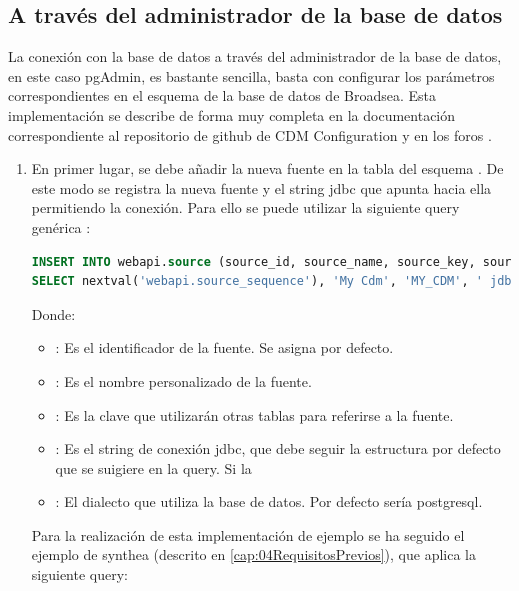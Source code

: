 \subsection{A través del administrador de la base de datos}

La conexión con la base de datos a través del administrador de la base de datos, en este caso pgAdmin, es bastante sencilla, basta con configurar los parámetros correspondientes en el esquema  de la base de datos de Broadsea. Esta implementación se describe de forma muy completa en la documentación correspondiente al repositorio de github de CDM Configuration \cite{githubCDMConfiguration} y en los foros \cite{forumAddMSDB}\cite{forumBroadQuickStart}.

\begin{enumerate}
    \item En primer lugar, se debe añadir la nueva fuente en la tabla  del esquema . De este modo se registra la nueva fuente y el string jdbc que apunta hacia ella permitiendo la conexión. Para ello se puede utilizar la siguiente query genérica \cite{githubCDMConfiguration}:

\begin{lstlisting}[language=sql]
INSERT INTO webapi.source (source_id, source_name, source_key, source_connection, source_dialect) 
SELECT nextval('webapi.source_sequence'), 'My Cdm', 'MY_CDM', ' jdbc:postgresql://server:5432/cdm?user={user}&password={password}', 'postgresql';
\end{lstlisting}

    Donde:
    \begin{itemize}
        \item {}: Es el identificador de la fuente. Se asigna por defecto.
        \item {}: Es el nombre personalizado de la fuente.
        \item {}: Es la clave que utilizarán otras tablas para referirse a la fuente.
        \item {}: Es el string de conexión jdbc, que debe seguir la estructura por defecto que se suigiere en la query. Si la
        \item {}: El dialecto que utiliza la base de datos. Por defecto sería postgresql.
    \end{itemize}

    Para la realización de esta implementación de ejemplo se ha seguido el ejemplo de synthea (descrito en \ref{cap:04RequisitosPrevios}), que aplica la siguiente query:


\end{enumerate}

